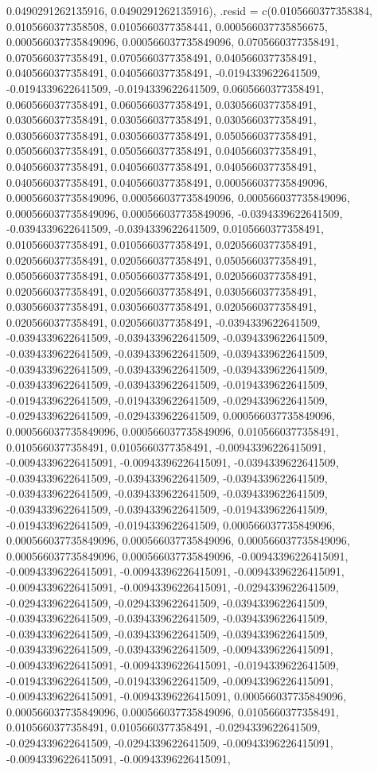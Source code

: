 \documentclass[
  ,man]{apa6}
\begin{document}
0.0490291262135916, 0.0490291262135916), .resid = c(0.0105660377358384, 0.0105660377358508, 0.0105660377358441, 0.000566037735856675, 0.000566037735849096, 0.000566037735849096, 0.0705660377358491, 0.0705660377358491, 0.0705660377358491, 0.0405660377358491, 0.0405660377358491, 0.0405660377358491, -0.0194339622641509, -0.0194339622641509, -0.0194339622641509, 0.0605660377358491, 0.0605660377358491, 0.0605660377358491, 0.0305660377358491, 0.0305660377358491, 0.0305660377358491, 0.0305660377358491,
0.0305660377358491, 0.0305660377358491, 0.0505660377358491, 0.0505660377358491, 0.0505660377358491, 0.0405660377358491, 0.0405660377358491, 0.0405660377358491, 0.0405660377358491, 0.0405660377358491, 0.0405660377358491, 0.000566037735849096, 0.000566037735849096, 0.000566037735849096, 0.000566037735849096, 0.000566037735849096, 0.000566037735849096, -0.0394339622641509, -0.0394339622641509, -0.0394339622641509, 0.0105660377358491, 0.0105660377358491, 0.0105660377358491, 0.0205660377358491, 0.0205660377358491,
0.0205660377358491, 0.0505660377358491, 0.0505660377358491, 0.0505660377358491, 0.0205660377358491, 0.0205660377358491, 0.0205660377358491, 0.0305660377358491, 0.0305660377358491, 0.0305660377358491, 0.0205660377358491, 0.0205660377358491, 0.0205660377358491, -0.0394339622641509, -0.0394339622641509, -0.0394339622641509, -0.0394339622641509, -0.0394339622641509, -0.0394339622641509, -0.0394339622641509, -0.0394339622641509, -0.0394339622641509, -0.0394339622641509, -0.0394339622641509, -0.0394339622641509,
-0.0194339622641509, -0.0194339622641509, -0.0194339622641509, -0.0294339622641509, -0.0294339622641509, -0.0294339622641509, 0.000566037735849096, 0.000566037735849096, 0.000566037735849096, 0.0105660377358491, 0.0105660377358491, 0.0105660377358491, -0.00943396226415091, -0.00943396226415091, -0.00943396226415091, -0.0394339622641509, -0.0394339622641509, -0.0394339622641509, -0.0394339622641509, -0.0394339622641509, -0.0394339622641509, -0.0394339622641509, -0.0394339622641509, -0.0394339622641509,
-0.0194339622641509, -0.0194339622641509, -0.0194339622641509, 0.000566037735849096, 0.000566037735849096, 0.000566037735849096, 0.000566037735849096, 0.000566037735849096, 0.000566037735849096, -0.00943396226415091, -0.00943396226415091, -0.00943396226415091, -0.00943396226415091, -0.00943396226415091, -0.00943396226415091, -0.0294339622641509, -0.0294339622641509, -0.0294339622641509, -0.0394339622641509, -0.0394339622641509, -0.0394339622641509, -0.0394339622641509, -0.0394339622641509, -0.0394339622641509,
-0.0394339622641509, -0.0394339622641509, -0.0394339622641509, -0.00943396226415091, -0.00943396226415091, -0.00943396226415091, -0.0194339622641509, -0.0194339622641509, -0.0194339622641509, -0.00943396226415091, -0.00943396226415091, -0.00943396226415091, 0.000566037735849096, 0.000566037735849096, 0.000566037735849096, 0.0105660377358491, 0.0105660377358491, 0.0105660377358491, -0.0294339622641509, -0.0294339622641509, -0.0294339622641509, -0.00943396226415091, -0.00943396226415091, -0.00943396226415091,
\end{document}
